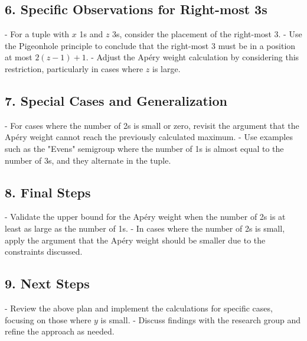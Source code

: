\documentclass[11pt]{article}
\begin{document}
\subsection*{6. Specific Observations for Right-most 3s}
- For a tuple with $x$ 1s and $z$ 3s, consider the placement of the right-most 3.
- Use the Pigeonhole principle to conclude that the right-most 3 must be in a position at most $2(z-1)+1$.
- Adjust the Apéry weight calculation by considering this restriction, particularly in cases where $z$ is large.

\subsection*{7. Special Cases and Generalization}
- For cases where the number of 2s is small or zero, revisit the argument that the Apéry weight cannot reach the previously calculated maximum.
- Use examples such as the "Evens" semigroup where the number of 1s is almost equal to the number of 3s, and they alternate in the tuple.

\subsection*{8. Final Steps}
- Validate the upper bound for the Apéry weight when the number of 2s is at least as large as the number of 1s.
- In cases where the number of 2s is small, apply the argument that the Apéry weight should be smaller due to the constraints discussed.

\subsection*{9. Next Steps}
- Review the above plan and implement the calculations for specific cases, focusing on those where $y$ is small.
- Discuss findings with the research group and refine the approach as needed.
\end{document}
